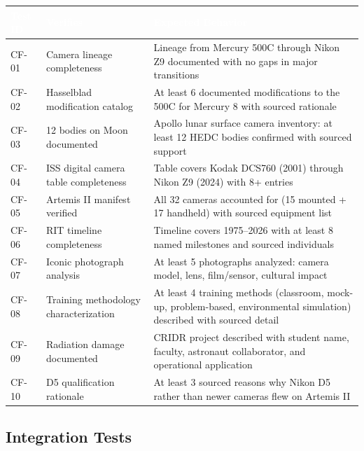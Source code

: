 \documentclass[11pt,letterpaper]{article}
\newcommand{\tableheader}[1]{\textbf{\sffamily\textcolor{white}{#1}}}
\begin{document}
\begin{center}
\begin{tabularx}{\textwidth}{L{1.5cm}L{4cm}X}
\toprule
{}
\tableheader{Test ID} & \tableheader{Verifies} & \tableheader{Expected Behavior} \\
\midrule
CF-01 & Camera lineage completeness & Lineage from Mercury 500C through Nikon Z9 documented with no gaps in major transitions \\
CF-02 & Hasselblad modification catalog & At least 6 documented modifications to the 500C for Mercury 8 with sourced rationale \\
CF-03 & 12 bodies on Moon documented & Apollo lunar surface camera inventory: at least 12 HEDC bodies confirmed with sourced support \\
CF-04 & ISS digital camera table completeness & Table covers Kodak DCS760 (2001) through Nikon Z9 (2024) with 8+ entries \\
CF-05 & Artemis II manifest verified & All 32 cameras accounted for (15 mounted + 17 handheld) with sourced equipment list \\
CF-06 & RIT timeline completeness & Timeline covers 1975--2026 with at least 8 named milestones and sourced individuals \\
CF-07 & Iconic photograph analysis & At least 5 photographs analyzed: camera model, lens, film/sensor, cultural impact \\
CF-08 & Training methodology characterization & At least 4 training methods (classroom, mock-up, problem-based, environmental simulation) described with sourced detail \\
CF-09 & Radiation damage documented & CRIDR project described with student name, faculty, astronaut collaborator, and operational application \\
CF-10 & D5 qualification rationale & At least 3 sourced reasons why Nikon D5 rather than newer cameras flew on Artemis II \\
\bottomrule
\end{tabularx}
\end{center}

\subsection{Integration Tests}
\end{document}
